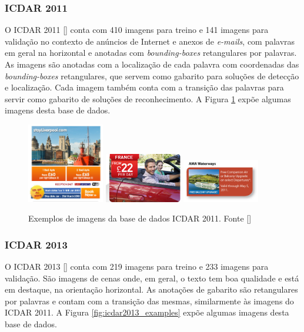 \subsubsection{ICDAR 2011}\label{sec:datasets_icdar2011}
O ICDAR 2011 [] conta com 410 imagens para treino e 141 imagens para validação no contexto de anúncios de Internet e anexos 
de \textit{e-mails}, com palavras em geral na horizontal e anotadas com \textit{bounding-boxes} retangulares por palavras. As imagens 
são anotadas com a localização de cada palavra com coordenadas das \textit{bounding-boxes} retangulares, que servem como gabarito para soluções 
de detecção e localização. Cada imagem também conta com a transição das palavras para servir como gabarito de soluções de reconhecimento. 
A Figura \ref{fig:icdar2011_examples} expõe algumas imagens desta base de dados.

\begin{figure}
    \centering
    \includegraphics[width=0.3\textwidth]{figs/img_33.png}
    \includegraphics[width=0.3\textwidth]{figs/img_62.jpg}
    \includegraphics[width=0.3\textwidth]{figs/img_13.jpg}
    \caption{Exemplos de imagens da base de dados ICDAR 2011. Fonte []}
        \label{fig:icdar2011_examples}
\end{figure}

\subsubsection{ICDAR 2013}\label{sec:datasets_icdar2013}
O ICDAR 2013 [] conta com 219 imagens para treino e 233 imagens para validação. São imagens de cenas onde, em geral, o texto 
tem boa qualidade e está em destaque, na orientação horizontal. As anotações de gabarito são retangulares por palavras e contam com a 
transição das mesmas, similarmente às imagens do ICDAR 2011. A Figura \ref{fig:icdar2013_examples} expõe algumas imagens desta base de dados.

